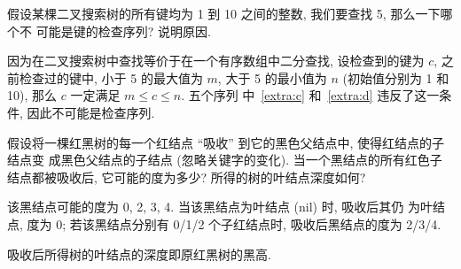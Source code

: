 \documentclass[boxes]{homework}
\begin{document}
\begin{problem}
假设某棵二叉搜索树的所有键均为 1 到 10 之间的整数, 我们要查找 5, 那么一下哪个不
可能是键的检查序列? 说明原因.
\end{problem}
\begin{solution}
    因为在二叉搜索树中查找等价于在一个有序数组中二分查找, 设检查到的键为 $c$, 之
    前检查过的键中, 小于 5 的最大值为 $m$, 大于 5 的最小值为 $n$ (初始值分别为 1
    和 10), 那么 $c$ 一定满足 $m \leqslant c \leqslant n$. 五个序列
    中~\ref{extra:c} 和~\ref{extra:d} 违反了这一条件, 因此不可能是检查序列.
\end{solution}

\begin{problem}
假设将一棵红黑树的每一个红结点 ``吸收'' 到它的黑色父结点中, 使得红结点的子结点变
成黑色父结点的子结点 (忽略关键字的变化). 当一个黑结点的所有红色子结点都被吸收后,
它可能的度为多少? 所得的树的叶结点深度如何?
\end{problem}
\begin{solution}
    该黑结点可能的度为 0, 2, 3, 4. 当该黑结点为叶结点 ({\sc nil}) 时, 吸收后其仍
    为叶结点, 度为 0; 若该黑结点分别有 0/1/2 个子红结点时, 吸收后黑结点的度为
    2/3/4.

    吸收后所得树的叶结点的深度即原红黑树的黑高.
\end{solution}
\end{document}
